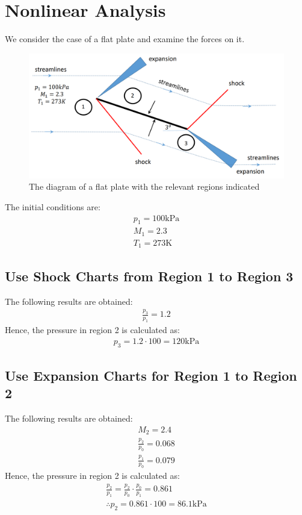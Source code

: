 \documentclass[class=report, crop=false, 12pt,a4paper]{standalone}
\begin{document}
\section{Nonlinear Analysis}
We consider the case of a flat plate and examine the forces on it. 
\begin{figure}[H]
    \centering
    \includegraphics[width = 0.9 \textwidth]{../img/diagram32.png}
    \caption{The diagram of a flat plate with the relevant regions indicated}
\end{figure}
The initial conditions are: 
\begin{gather}
    p_1 = 100\si{\kilo\pascal} \\[5pt]
    M_1 = 2.3 \\[5pt]
    T_1 = 273\si{\kelvin}
\end{gather}
\subsection{Use Shock Charts from Region 1 to Region 3}
The following results are obtained: 
\begin{gather}
    \frac{p_3}{p_1} = 1.2 
\end{gather}
Hence, the pressure in region 2 is calculated as: 
\begin{gather}
    p_3 = 1.2\cdot 100 = 120\si{\kilo\pascal}
\end{gather}
\subsection{Use Expansion Charts for Region 1 to Region 2}
The following results are obtained: 
\begin{gather}
    M_2 = 2.4 \\[5pt]
    \frac{p_2}{p_0} = 0.068 \\[5pt]
    \frac{p_1}{p_0} = 0.079
\end{gather}
Hence, the pressure in region 2 is calculated as: 
\begin{gather}
    \frac{p_2}{p_1} = \frac{p_2}{p_0}\cdot \frac{p_0}{p_1} = 0.861 \\[5pt]
    \therefore p_2 = 0.861\cdot 100 = 86.1\si{\kilo\pascal}
\end{gather}
\end{document}

